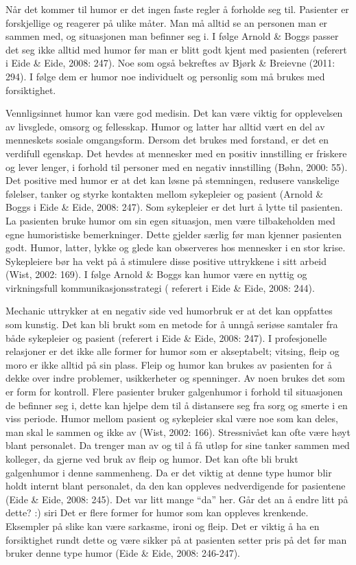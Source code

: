 Når det kommer til humor er det ingen faste regler å forholde seg til.
Pasienter er forskjellige og reagerer på ulike måter. Man må alltid se an
personen man er sammen med, og situasjonen man befinner seg i. I følge Arnold
\&{} Boggs passer det seg ikke alltid med humor før man er blitt godt kjent med
pasienten (referert i Eide \&{} Eide, 2008: 247). Noe som også bekreftes av Bjørk
\&{} Breievne (2011: 294). I følge dem er humor noe individuelt og personlig som
må brukes med forsiktighet.

Vennligsinnet humor kan være god medisin. Det kan være viktig for opplevelsen
av livsglede, omsorg og fellesskap. Humor og latter har alltid vært en del av
menneskets sosiale omgangsform. Dersom det brukes med forstand, er det en
verdifull egenskap. Det hevdes at mennesker med en positiv innstilling er
friskere og lever lenger, i forhold til personer med en negativ innstilling
(Bøhn, 2000: 55). Det positive med humor er at det kan løsne på stemningen,
redusere vanskelige følelser, tanker og styrke kontakten mellom sykepleier og
pasient (Arnold \&{} Boggs i Eide \&{} Eide, 2008: 247). Som sykepleier er det lurt å
lytte til pasienten. La pasienten bruke humor om sin egen situasjon, men være
tilbakeholden med egne humoristiske bemerkninger. Dette gjelder særlig før man
kjenner pasienten godt. Humor, latter, lykke og glede kan observeres hos
mennesker i en stor krise. Sykepleiere bør ha vekt på å stimulere disse
positive uttrykkene i sitt arbeid (Wist, 2002: 169). I følge Arnold \&{} Boggs kan
humor være en nyttig og virkningsfull kommunikasjonsstrategi ( referert i Eide
\&{} Eide, 2008: 244).

Mechanic uttrykker at en negativ side ved humorbruk er at det kan oppfattes som
kunstig. Det kan bli brukt som en metode for å unngå seriøse samtaler fra både
sykepleier og pasient (referert i Eide \&{} Eide, 2008: 247). I profesjonelle
relasjoner er det ikke alle former for humor som er akseptabelt; vitsing, fleip
og moro er ikke alltid på sin plass. Fleip og humor kan brukes av pasienten for
å dekke over indre problemer, usikkerheter og spenninger. Av noen brukes det
som er form for kontroll. Flere pasienter bruker galgenhumor i forhold til
situasjonen de befinner seg i, dette kan hjelpe dem til å distansere seg fra
sorg og smerte i en viss periode. Humor mellom pasient og sykepleier skal være
noe som kan deles, man skal le sammen og ikke av (Wist, 2002: 166).
Stressnivået kan ofte være høyt blant personalet. Da trenger man av og til å få
utløp for sine tanker sammen med kolleger, da gjerne ved bruk av fleip og
humor. Det kan ofte bli brukt galgenhumor i denne sammenheng. Da er det viktig
at denne type humor blir holdt internt blant personalet, da den kan oppleves
nedverdigende for pasientene (Eide \&{} Eide, 2008: 245). Det var litt mange “da”
her. Går det an å endre litt på dette? :) siri Det er flere former for humor
som kan oppleves krenkende. Eksempler på slike kan være sarkasme, ironi og
fleip. Det er viktig å ha en forsiktighet rundt dette og være sikker på at
pasienten setter pris på det før man bruker denne type humor (Eide \&{} Eide,
2008: 246-247).

